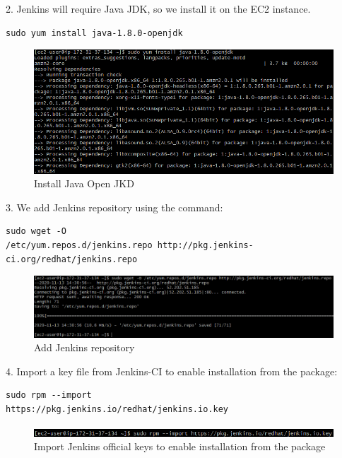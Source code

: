 \documentclass[12pt,a4paper,twoside]{article}
\begin{document}
2. Jenkins will require Java JDK, so we install it on the EC2 instance.


\begin{verbatim}
sudo yum install java-1.8.0-openjdk
\end{verbatim}


\begin{figure}[H]
    \centering
        \includegraphics[width=15cm]{images-aws/15-install-java.png}
        \caption{Install Java Open JKD}
\end{figure}


3. We add Jenkins repository using the command:


\begin{verbatim}
sudo wget -O
/etc/yum.repos.d/jenkins.repo http://pkg.jenkins-
ci.org/redhat/jenkins.repo
\end{verbatim}


\begin{figure}[H]
    \centering
        \includegraphics[width=15cm]{images-aws/16-download-jenkins.png}
        \caption{Add Jenkins repository}
\end{figure}


4. Import a key file from Jenkins-CI to enable installation from the package:


\begin{verbatim}
sudo rpm --import
https://pkg.jenkins.io/redhat/jenkins.io.key
\end{verbatim}


\begin{figure}[H]
    \centering
        \includegraphics[width=15cm]{images-aws/17-import-jenkins-keys.png}
        \caption{Import Jenkins official keys to enable installation from the package}
\end{figure}
\end{document}
